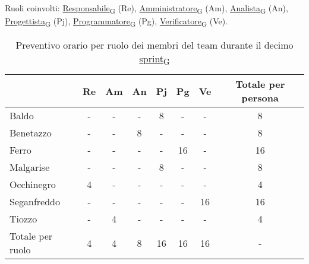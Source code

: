 \newpage
{}
Ruoli coinvolti: \href{https://7last.github.io/docs/rtb/documentazione-interna/glossario\#responsabile}{Responsabile\textsubscript{G}} (Re), \href{https://7last.github.io/docs/rtb/documentazione-interna/glossario\#amministratore}{Amministratore\textsubscript{G}} (Am), \href{https://7last.github.io/docs/rtb/documentazione-interna/glossario\#analista}{Analista\textsubscript{G}} (An), \href{https://7last.github.io/docs/rtb/documentazione-interna/glossario\#progettista}{Progettista\textsubscript{G}} (Pj), \href{https://7last.github.io/docs/rtb/documentazione-interna/glossario\#programmatore}{Programmatore\textsubscript{G}} (Pg), \href{https://7last.github.io/docs/rtb/documentazione-interna/glossario\#verificatore}{Verificatore\textsubscript{G}} (Ve).
\begin{table}[!h]
    \centering
    \begin{tabular}{ | l | c | c | c | c | c | c | c | }
        \hline
        \textbf{} & \textbf{Re} & \textbf{Am} &\textbf{An} & \textbf{Pj} & \textbf{Pg} & \textbf{Ve} & \textbf{Totale per persona} \\
        \hline
        Baldo            &  -   &  -   &  -   &  8   &  -   &  -   &  8   \\
        Benetazzo        &  -   &  -   &  8   &  -   &  -   &  -   &  8   \\
        Ferro            &  -   &  -   &  -   &  -   & 16   &  -   & 16   \\
        Malgarise        &  -   &  -   &  -   &  8   &  -   &  -   &  8   \\
        Occhinegro       &  4   &  -   &  -   &  -   &  -   &  -   &  4   \\
        Seganfreddo      &  -   &  -   &  -   &  -   &  -   & 16   & 16   \\
        Tiozzo           &  -   &  4   &  -   &  -   &  -   &  -   &  4   \\
        \hline
        Totale per ruolo &  4   &  4   &  8   & 16   & 16   & 16   &  -   \\
        \hline
    \end{tabular}
    \caption{Preventivo orario per ruolo dei membri del team durante il decimo \href{https://7last.github.io/docs/rtb/documentazione-interna/glossario\#sprint}{sprint\textsubscript{G}}}
    
\end{table}

